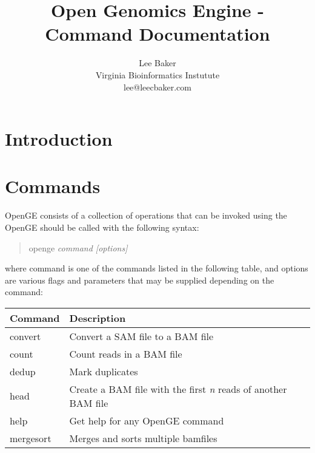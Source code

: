 \documentclass[11pt]{article}
\newcommand {\cmd}[1] {\begin{quote}#1\end{quote}}
\begin{document}
\title{Open Genomics Engine - Command Documentation}
\author{Lee Baker\\
Virginia Bioinformatics Instutute\\
lee@leecbaker.com}
\maketitle

\section {Introduction}
\section {Commands}
OpenGE consists of a collection of operations that can be invoked using the 
OpenGE should be called with the following syntax:

\cmd{openge \textit{command [options]}}

where command is one of the commands listed in the following table, and options are various flags and parameters that may be supplied depending on the command:

\begin{center}
\begin{tabular}{lp{3.5in}}
\hline
Command&Description\\ \hline
convert&Convert a SAM file to a BAM file\\
count&Count reads in a BAM file\\
dedup&Mark duplicates\\
head&Create a BAM file with the first \textit{n} reads of another BAM file\\
help&Get help for any OpenGE command\\
mergesort&Merges and sorts multiple bamfiles\\
\end{tabular}
\end{center}
\end{document}
